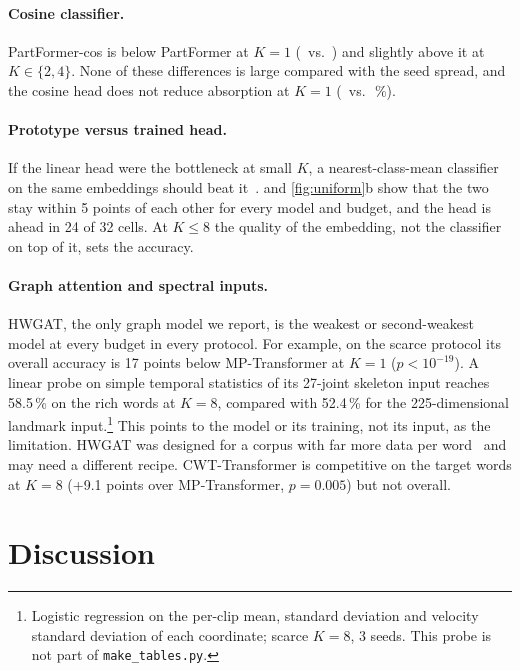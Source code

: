 \documentclass[11pt]{article}
\begin{document}
\paragraph{Cosine classifier.}
PartFormer-cos is below PartFormer at $K{=}1$ (\PFCtgtA\ vs.\ \PFtgtA) and slightly above it
at $K\in\{2,4\}$. None of these differences is large compared with the seed spread, and the
cosine head does not reduce absorption at $K{=}1$ (\PFCabsA\ vs.\ \PFabsA\,\%).



\paragraph{Prototype versus trained head.}
If the linear head were the bottleneck at small $K$, a nearest-class-mean classifier on the
same embeddings should beat it~\citep{snell2017proto,chen2019closer}.  and
\cref{fig:uniform}b show that the two stay within 5 points of each other for every
model and budget, and the head is ahead in 24 of 32 cells. At $K\le8$ the quality of the
embedding, not the classifier on top of it, sets the accuracy.

\paragraph{Graph attention and spectral inputs.}
HWGAT, the only graph model we report, is the weakest or second-weakest model at every budget in every protocol. For example,
on the scarce protocol its overall accuracy is 17 points below MP-Transformer at $K{=}1$
($p<10^{-19}$). A linear probe on simple temporal statistics of its 27-joint skeleton input
reaches 58.5\,\% on the rich words at $K{=}8$, compared with 52.4\,\% for the 225-dimensional
landmark input.\footnote{Logistic regression on the per-clip mean, standard deviation and velocity standard deviation of each coordinate; scarce $K{=}8$, 3 seeds. This probe is not part of \texttt{make\_tables.py}.} This points to the model or its training, not its input, as the limitation.
HWGAT was designed for a corpus with far more data per word~\citep{patra2024hwgat} and may
need a different recipe. CWT-Transformer is competitive on the target words at $K{=}8$
(+9.1 points over MP-Transformer, $p{=}0.005$) but not overall.

\section{Discussion}
\end{document}
